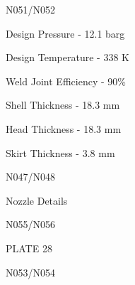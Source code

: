 \documentclass[a4paper,portrait,12pt]{article}
\begin{document}
\begin{flushleft}
N051/N052
\end{flushleft}





\begin{flushleft}
Design Pressure - 12.1 barg
\end{flushleft}


\begin{flushleft}
Design Temperature - 338 K
\end{flushleft}


\begin{flushleft}
Weld Joint Efficiency - 90\%
\end{flushleft}


\begin{flushleft}
Shell Thickness - 18.3 mm
\end{flushleft}


\begin{flushleft}
Head Thickness - 18.3 mm
\end{flushleft}


\begin{flushleft}
Skirt Thickness - 3.8 mm
\end{flushleft}





\begin{flushleft}
N047/N048
\end{flushleft}





\begin{flushleft}
Nozzle Details
\end{flushleft}





\begin{flushleft}
N055/N056
\end{flushleft}





\begin{flushleft}
PLATE 28
\end{flushleft}





\begin{flushleft}
N053/N054
\end{flushleft}
\end{document}
